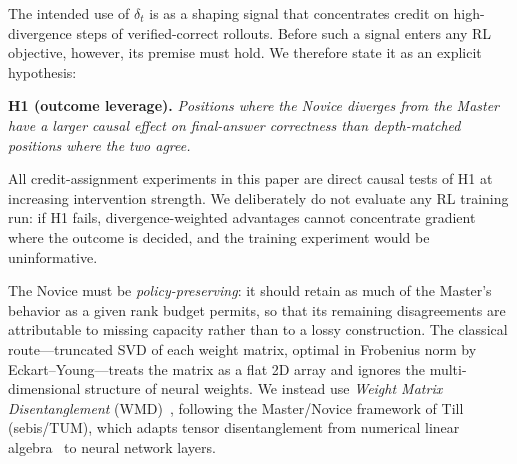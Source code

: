 \documentclass[times, 10pt,twocolumn]{article}
\begin{document}
The intended use of $\delta_t$ is as a shaping signal that concentrates credit
on high-divergence steps of verified-correct rollouts. Before such a signal
enters any RL objective, however, its premise must hold. We therefore state it
as an explicit hypothesis:

\medskip
\noindent\textbf{H1 (outcome leverage).} \emph{Positions where the Novice
diverges from the Master have a larger causal effect on final-answer
correctness than depth-matched positions where the two agree.}
\medskip

\noindent All credit-assignment experiments in this paper are direct causal
tests of H1 at increasing intervention strength. We deliberately do not
evaluate any RL training run: if H1 fails, divergence-weighted advantages
cannot concentrate gradient where the outcome is decided, and the training
experiment would be uninformative.

\label{sec:wmd}

The Novice must be \emph{policy-preserving}: it should retain as much of the
Master's behavior as a given rank budget permits, so that its remaining
disagreements are attributable to missing capacity rather than to a lossy
construction. The classical route---truncated SVD of each weight matrix,
optimal in Frobenius norm by Eckart--Young---treats the matrix as a flat 2D
array and ignores the multi-dimensional structure of neural weights. We
instead use \emph{Weight Matrix Disentanglement}
(WMD)~\cite{till2026introspection}, following the Master/Novice framework of
Till (sebis/TUM), which adapts tensor disentanglement from numerical linear
algebra~\cite{wei2025tensor} to neural network layers.
\end{document}
